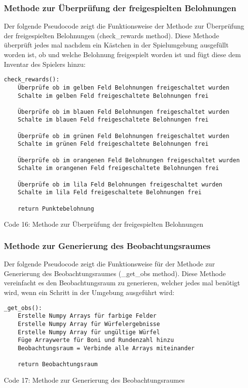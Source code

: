 \subsubsection{Methode zur Überprüfung der freigespielten Belohnungen}
\begin{minipage}{\linewidth}
Der folgende Pseudocode zeigt die Funktionsweise der Methode zur Überprüfung der freigespielten Belohnungen (check\_rewards method). Diese Methode überprüft jedes mal nachdem ein Kästchen in der Spielumgebung ausgefüllt worden ist, ob und welche Belohnung freigespielt worden ist und fügt diese dem Inventar des Spielers hinzu:
\vspace{0.5cm}
\begin{lstlisting}
check_rewards():
	Überprüfe ob im gelben Feld Belohnungen freigeschaltet wurden
	Schalte im gelben Feld freigeschaltete Belohnungen frei
	
	Überprüfe ob im blauen Feld Belohnungen freigeschaltet wurden
	Schalte im blauen Feld freigeschaltete Belohnungen frei
	
	Überprüfe ob im grünen Feld Belohnungen freigeschaltet wurden
	Schalte im grünen Feld freigeschaltete Belohnungen frei
	
	Überprüfe ob im orangenen Feld Belohnungen freigeschaltet wurden
	Schalte im orangenen Feld freigeschaltete Belohnungen frei
	
	Überprüfe ob im lila Feld Belohnungen freigeschaltet wurden
	Schalte im lila Feld freigeschaltete Belohnungen frei
	
	return Punktebelohnung
\end{lstlisting}
Code 16: Methode zur Überprüfung der freigespielten Belohnungen\\
\end{minipage}

\subsubsection{Methode zur Generierung des Beobachtungsraumes}
\begin{minipage}{\linewidth}
Der folgende Pseudocode zeigt die Funktionsweise für der Methode zur Generierung des Beobachtungsraumes (\_get\_obs method). Diese Methode vereinfacht es den Beobachtungsraum zu generieren, welcher jedes mal benötigt wird, wenn ein Schritt in der Umgebung ausgeführt wird:
\vspace{0.5cm}
\begin{lstlisting}
_get_obs():
	Erstelle Numpy Arrays für farbige Felder
	Erstelle Numpy Array für Würfelergebnisse
	Erstelle Numpy Array für ungültige Würfel
	Füge Arraywerte für Boni und Rundenzahl hinzu
	Beobachtungsraum = Verbinde alle Arrays miteinander
	
	return Beobachtungsraum
\end{lstlisting}
Code 17: Methode zur Generierung des Beobachtungsraumes\\
\end{minipage}

